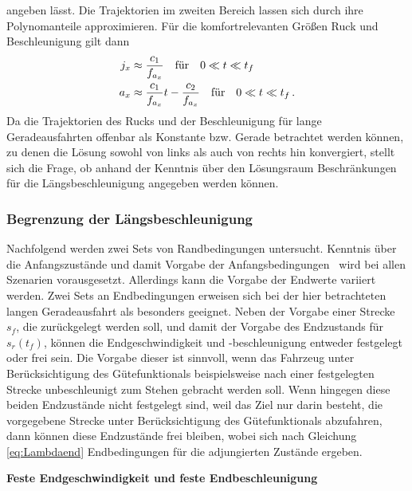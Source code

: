 angeben lässt. Die Trajektorien im zweiten Bereich lassen sich durch ihre Polynomanteile approximieren. Für die komfortrelevanten Größen Ruck und Beschleunigung gilt dann
\begin{align}
j_x &\approx \frac{c_1}{f_{a_x}} \quad\textrm{für}\quad 0\ll t\ll t_f \label{eq:j_Bereich_2}
\\
a_x &\approx \frac{c_1}{f_{a_x}}t - \frac{c_2}{f_{a_x}} \quad\textrm{für}\quad 0\ll t\ll t_f\,. \label{eq:a_Bereich_2}
\end{align}
Da die Trajektorien des Rucks und der Beschleunigung für lange Geradeausfahrten offenbar als Konstante bzw. Gerade betrachtet werden können, zu denen die Lösung sowohl von links als auch von rechts hin konvergiert, stellt sich die Frage, ob anhand der Kenntnis über den Lösungsraum Beschränkungen für die Längsbeschleunigung angegeben werden können. 

\subsubsection{Begrenzung der Längsbeschleunigung}\label{subsubsec:Begrenzung_ax}
Nachfolgend werden zwei Sets von Randbedingungen untersucht. Kenntnis über die Anfangszustände und damit Vorgabe der Anfangsbedingungen \xzero~wird bei allen Szenarien vorausgesetzt. Allerdings kann die Vorgabe der Endwerte variiert werden. Zwei Sets an Endbedingungen erweisen sich bei der hier betrachteten langen Geradeausfahrt als besonders geeignet. Neben der Vorgabe einer Strecke $s_f$, die zurückgelegt werden soll, und damit der Vorgabe des Endzustands für $s_r(t_f)$, können die Endgeschwindigkeit und -beschleunigung entweder festgelegt oder frei sein. Die Vorgabe dieser ist sinnvoll, wenn das Fahrzeug unter Berücksichtigung des Gütefunktionals beispielsweise nach einer festgelegten Strecke unbeschleunigt zum Stehen gebracht werden soll. Wenn hingegen diese beiden Endzustände nicht festgelegt sind, weil das Ziel nur darin besteht, die vorgegebene Strecke unter Berücksichtigung des Gütefunktionals abzufahren, dann können diese Endzustände frei bleiben, wobei sich nach Gleichung \eqref{eq:Lambdaend} Endbedingungen für die adjungierten Zustände ergeben. 

\textbf{Feste Endgeschwindigkeit und feste Endbeschleunigung}

